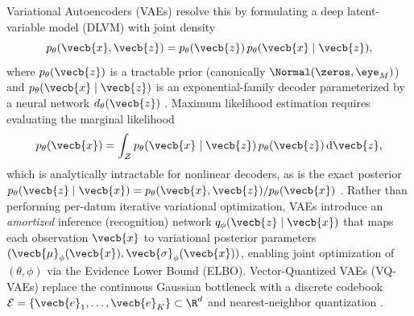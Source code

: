 \documentclass[../../../../master.tex]{subfiles}
\begin{document}
Variational Autoencoders (VAEs) resolve this by formulating a deep latent-variable model (DLVM) with joint density
\begin{equation}\label{eq:vae:joint_model}
  p_\theta(\vecb{x}, \vecb{z}) = p_\theta(\vecb{z})\,p_\theta(\vecb{x} \mid \vecb{z}),
\end{equation}
where $p_\theta(\vecb{z})$ is a tractable prior (canonically $\Normal(\zeros, \eye_M)$) and $p_\theta(\vecb{x} \mid \vecb{z})$ is an exponential-family decoder parameterized by a neural network $d_\theta(\vecb{z})$ . Maximum likelihood estimation requires evaluating the marginal likelihood
\begin{equation}\label{eq:vae:marginal}
  p_\theta(\vecb{x}) = \int_{\mathcal{Z}} p_\theta(\vecb{x} \mid \vecb{z})\,p_\theta(\vecb{z})\,\mathrm{d}\vecb{z},
\end{equation}
which is analytically intractable for nonlinear decoders, as is the exact posterior $p_\theta(\vecb{z} \mid \vecb{x}) = p_\theta(\vecb{x}, \vecb{z})/p_\theta(\vecb{x})$  . Rather than performing per-datum iterative variational optimization, VAEs introduce an \emph{amortized} inference (recognition) network $q_\phi(\vecb{z} \mid \vecb{x})$ that maps each observation $\vecb{x}$ to variational posterior parameters $(\vecb{\mu}_\phi(\vecb{x}), \vecb{\sigma}_\phi(\vecb{x}))$, enabling joint optimization of $(\theta, \phi)$ via the Evidence Lower Bound (ELBO). Vector-Quantized VAEs (VQ-VAEs) replace the continuous Gaussian bottleneck with a discrete codebook $\mathcal{E} = \{\vecb{e}_1, \dots, \vecb{e}_K\} \subset \R^d$ and nearest-neighbor quantization .
\end{document}
